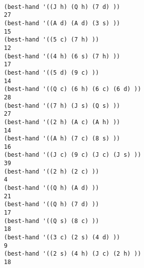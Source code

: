 \documentclass[11pt]{article}
\begin{document}
	\begin{lstlisting}[caption=results of best hand test runs, label=besthand]

(best-hand '((J h) (Q h) (7 d) ))
27
(best-hand '((A d) (A d) (3 s) ))
15
(best-hand '((5 c) (7 h) ))
12
(best-hand '((4 h) (6 s) (7 h) ))
17
(best-hand '((5 d) (9 c) ))
14
(best-hand '((Q c) (6 h) (6 c) (6 d) ))
28
(best-hand '((7 h) (J s) (Q s) ))
27
(best-hand '((2 h) (A c) (A h) ))
14
(best-hand '((A h) (7 c) (8 s) ))
16
(best-hand '((J c) (9 c) (J c) (J s) ))
39
(best-hand '((2 h) (2 c) ))
4
(best-hand '((Q h) (A d) ))
21
(best-hand '((Q h) (7 d) ))
17
(best-hand '((Q s) (8 c) ))
18
(best-hand '((3 c) (2 s) (4 d) ))
9
(best-hand '((2 s) (4 h) (J c) (2 h) ))
18
	\end{lstlisting}
	
\end{document}

